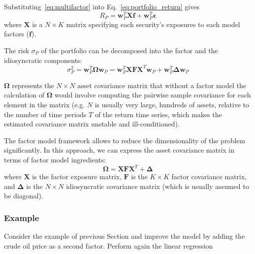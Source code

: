 Substituting~\ref{eq:multifactor} into Eq.~\ref{eq:portfolio_return} gives
\begin{equation}
R_P = \mathbf{w}^T_P \mathbf{Xf} + \mathbf{w}^T_P\boldsymbol{\epsilon}
\end{equation}
where $\mathbf{X}$ is a $N\times K$ matrix specifying each security’s exposures to each model factors ($\mathbf{f}$).

The risk $\sigma_P$ of the portfolio can be decomposed into the factor and the idiosyncratic components:
\begin{equation}
\sigma^2_P = \mathbf{w}_P^T\mathbf{\Omega}\mathbf{w}_P = \mathbf{w}_P^T \mathbf{XFX}^T \mathbf{w}_P + \mathbf{w}_P^T \mathbf{\Delta} \mathbf{w}_P
\end{equation}

$\mathbf{\Omega}$ represents the $N \times N$ asset covariance matrix that without a factor model the calculation of $\mathbf{\Omega}$ would involve computing the pairwise sample covariance for each element in the matrix (e.g. $N$ is usually very large, hundreds of assets, relative to the number of time periods $T$ of the return time series, which makes the estimated covariance matrix unstable and ill-conditioned).

The factor model framework allows to reduce the dimensionality of the problem significantly. In this approach, we can express the asset covariance matrix in terms of factor model ingredients:
\begin{equation}
\mathbf{\Omega} = \mathbf{XFX}^T + \mathbf{\Delta}
\end{equation}
where $\mathbf{X}$ is the factor exposure matrix, $\mathbf{F}$ is the $K\times K$ factor covariance matrix, and $\mathbf{\Delta}$ is the $N\times N$ idiosyncratic covariance matrix (which is usually assumed to be diagonal).

\subsubsection{Example}

Consider the example of previous Section and improve the model by adding the crude oil price as a second factor. Perform again the linear regression


